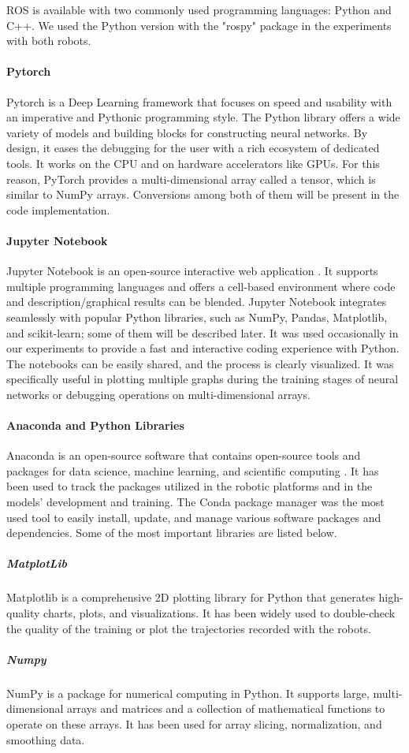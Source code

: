 ROS is available with two commonly used programming languages: Python and C++. We used the Python version with the "rospy" package in the experiments with both robots.

\paragraph{Pytorch}
Pytorch is a Deep Learning framework \cite{paszke2019pytorch} that focuses on speed and usability with an imperative and Pythonic programming style.  The Python library \cite{url:pytorch} offers a wide variety of models and building blocks for constructing neural networks. By design, it eases the debugging for the user with a rich ecosystem of dedicated tools. It works on the CPU and on hardware accelerators like GPUs. For this reason, PyTorch provides a multi-dimensional array called a tensor, which is similar to NumPy arrays. Conversions among both of them will be present in the code implementation. 

\paragraph{Jupyter Notebook}
Jupyter Notebook is an open-source interactive web application \cite{url:jupyter}. It supports multiple programming languages and offers a cell-based environment where code and description/graphical results can be blended. Jupyter Notebook integrates seamlessly with popular Python libraries, such as NumPy, Pandas, Matplotlib, and scikit-learn; some of them will be described later. It was used occasionally in our experiments to provide a fast and interactive coding experience with Python. The notebooks can be easily shared, and the process is clearly visualized. It was specifically useful in plotting multiple graphs during the training stages of neural networks or debugging operations on multi-dimensional arrays. 

\paragraph{Anaconda and Python Libraries}
Anaconda is an open-source software that contains open-source tools and packages for data science, machine learning, and scientific computing \cite{url:anaconda}. It has been used to track the packages utilized in the robotic platforms and in the models' development and training. The Conda package manager was the most used tool to easily install, update, and manage various software packages and dependencies. Some of the most important libraries are listed below.
\subparagraph{MatplotLib} Matplotlib is a comprehensive 2D plotting library for Python that generates high-quality charts, plots, and visualizations. It has been widely used to double-check the quality of the training or plot the trajectories recorded with the robots. 
\subparagraph{Numpy} NumPy is a package for numerical computing in Python. It supports large, multi-dimensional arrays and matrices and a collection of mathematical functions to operate on these arrays. It has been used for array slicing, normalization, and smoothing data. 